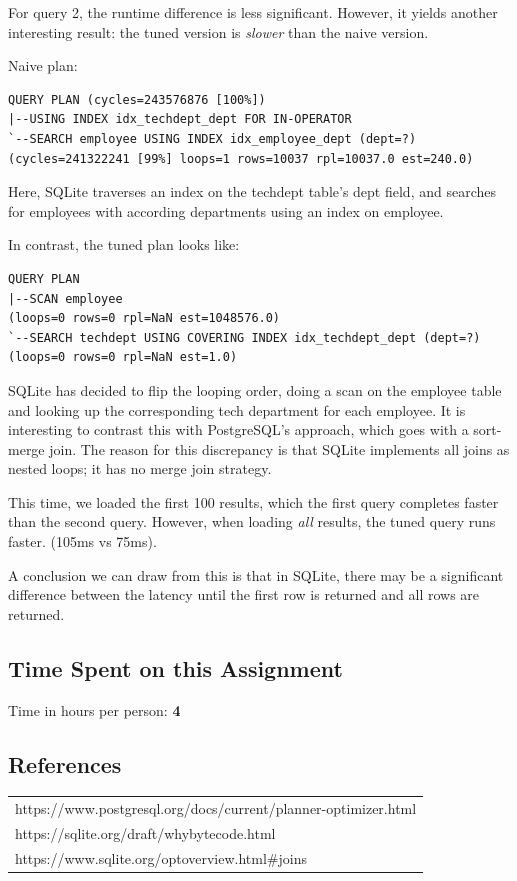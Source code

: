 \documentclass[11pt]{scrartcl}
\begin{document}
For query 2, the runtime difference is less significant.  However, it yields another interesting result: the tuned version is \textit{slower} than the naive version.

Naive plan:

{\small
\parskip0pt\begin{verbatim}
QUERY PLAN (cycles=243576876 [100%])
|--USING INDEX idx_techdept_dept FOR IN-OPERATOR
`--SEARCH employee USING INDEX idx_employee_dept (dept=?)     (cycles=241322241 [99%] loops=1 rows=10037 rpl=10037.0 est=240.0)
\end{verbatim}}

Here, SQLite traverses an index on the techdept table's dept field, and searches for employees with according departments using an index on employee.

In contrast, the tuned plan looks like:

{\small
\parskip0pt\begin{verbatim}
QUERY PLAN
|--SCAN employee                                                       (loops=0 rows=0 rpl=NaN est=1048576.0)
`--SEARCH techdept USING COVERING INDEX idx_techdept_dept (dept=?)     (loops=0 rows=0 rpl=NaN est=1.0)
\end{verbatim}}

SQLite has decided to flip the looping order, doing a scan on the employee table and looking up the corresponding tech department for each employee.  It is interesting to contrast this with PostgreSQL's approach, which goes with a sort-merge join.  The reason for this discrepancy is that SQLite implements all joins as nested loops; it has no merge join strategy.

This time, we loaded the first 100 results, which the first query completes faster than the second query.  However, when loading \textit{all} results, the tuned query runs faster. (105ms vs 75ms).

A conclusion we can draw from this is that in SQLite, there may be a significant difference between the latency until the first row is returned and all rows are returned.

\subsection*{Time Spent on this Assignment}

Time in hours per person: \textbf{4}

\subsection*{References}

\begin{table}[H]
  \centering
  \begin{tabular}{l}
    \hline
    https://www.postgresql.org/docs/current/planner-optimizer.html \tabularnewline
    https://sqlite.org/draft/whybytecode.html \tabularnewline
    https://www.sqlite.org/optoverview.html\#joins \tabularnewline
    \hline
  \end{tabular}
\end{table}
\end{document}
